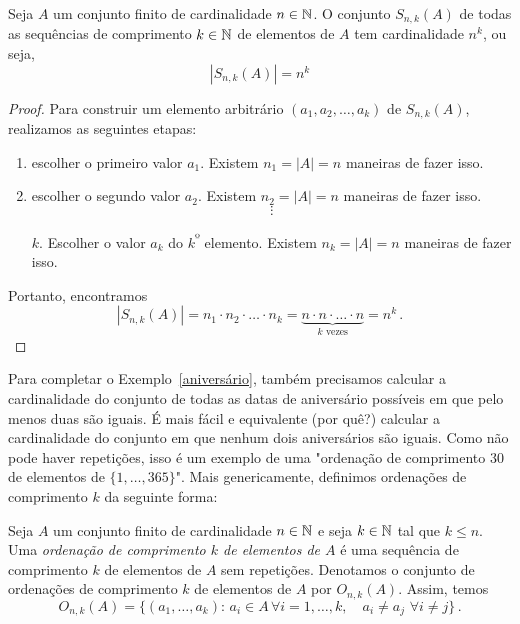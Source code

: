 \begin{proposition}\label{prop_seq_card}
Seja $A$ um conjunto finito de cardinalidade $n \in \mathbb{N}$. O conjunto $S_{n,k}(A)$ de todas as sequências de comprimento $k \in \mathbb{N}$ de elementos de $A$ tem cardinalidade $n^k$, ou seja,
\begin{equation}
|S_{n,k}(A)|=n^k
\end{equation}
\end{proposition}
\begin{proof}

\noindent Para construir um elemento arbitrário $(a_1,a_2,\dots,a_k)$ de $S_{n,k}(A)$, realizamos as seguintes etapas:
\begin{enumerate}
\item escolher o primeiro valor $a_1$. Existem $n_1=|A|=n$ maneiras de fazer isso.
\item escolher o segundo valor $a_2$. Existem $n_2=|A|=n$ maneiras de fazer isso.
$$\vdots$$
\item[$k$.] Escolher o valor $a_k$ do $k$\textsuperscript{º} elemento. Existem $n_k=|A|=n$ maneiras de fazer isso.
\end{enumerate}
Portanto, encontramos
\begin{equation}
|S_{n,k}(A)| = n_1 \cdot n_2 \cdot \dots \cdot n_k = \underbrace{n \cdot n \cdot \dots \cdot n}_{k \text{ vezes}} = n^k \,.
\end{equation}
\end{proof}

Para completar o Exemplo~\ref{aniversário}, também precisamos calcular a cardinalidade do conjunto de todas as datas de aniversário possíveis em que pelo menos duas são iguais. É mais fácil e equivalente (por quê?) calcular a cardinalidade do conjunto em que nenhum dois aniversários são iguais. Como não pode haver repetições, isso é um exemplo de uma "ordenação de comprimento $30$ de elementos de $\{1,\dots,365\}$". Mais genericamente, definimos ordenações de comprimento $k$ da seguinte forma:

\begin{definition}
Seja $A$ um conjunto finito de cardinalidade $n \in \mathbb{N}$ e seja $k \in \mathbb{N}$ tal que $k \leq n$. Uma \emph{ordenação de comprimento $k$ de elementos de $A$} é uma sequência de comprimento $k$ de elementos de $A$ sem repetições. Denotamos o conjunto de ordenações de comprimento $k$ de elementos de $A$ por $O_{n,k}(A)$. Assim, temos
\begin{equation}
O_{n,k}(A) = \{(a_1,\dots,a_k): \, a_i \in A \, \forall i=1,\dots,k, \quad a_i \neq a_{j} \,\, \forall i \neq j\} \,.
\end{equation}
\end{definition}

